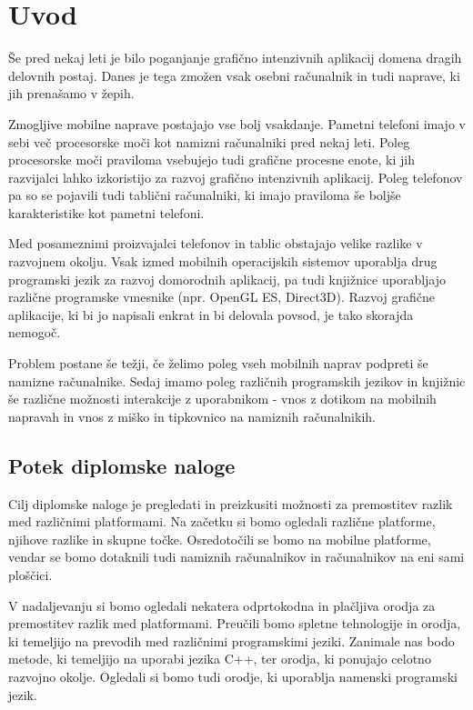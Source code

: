 \chapter{Uvod}

Še pred nekaj leti je bilo poganjanje grafično intenzivnih aplikacij domena dragih delovnih postaj. Danes je tega zmožen vsak osebni računalnik in tudi naprave, ki jih prenašamo v žepih.

Zmogljive mobilne naprave postajajo vse bolj vsakdanje. Pametni telefoni imajo v sebi več procesorske moči kot namizni računalniki pred nekaj leti. Poleg procesorske moči praviloma vsebujejo tudi grafične procesne enote, ki jih razvijalci lahko izkoristijo za razvoj grafično intenzivnih aplikacij. Poleg telefonov pa so se pojavili tudi tablični računalniki, ki imajo praviloma še boljše karakteristike kot pametni telefoni. 

Med posameznimi proizvajalci telefonov in tablic obstajajo velike razlike v razvojnem okolju. Vsak izmed mobilnih operacijskih sistemov uporablja drug programski jezik za razvoj domorodnih aplikacij, pa tudi knjižnice uporabljajo različne programske vmesnike (npr. OpenGL ES, Direct3D). Razvoj grafične aplikacije, ki bi jo napisali enkrat in bi delovala povsod, je tako skorajda nemogoč.

Problem postane še težji, če želimo poleg vseh mobilnih naprav podpreti še namizne računalnike. Sedaj imamo poleg različnih programskih jezikov in knjižnic še različne možnosti interakcije z uporabnikom - vnos z dotikom na mobilnih napravah in vnos z miško in tipkovnico na namiznih računalnikih.

\section{Potek diplomske naloge}

Cilj diplomske naloge je pregledati in preizkusiti možnosti za premostitev razlik med različnimi platformami. Na začetku si bomo ogledali različne platforme, njihove razlike in skupne točke. Osredotočili se bomo na mobilne platforme, vendar se bomo dotaknili tudi namiznih računalnikov in računalnikov na eni sami ploščici.

V nadaljevanju si bomo ogledali nekatera odprtokodna in plačljiva orodja za premostitev razlik med platformami. Preučili bomo spletne tehnologije in orodja, ki temeljijo na prevodih med različnimi programskimi jeziki. Zanimale nas bodo metode, ki temeljijo na uporabi jezika C++, ter orodja, ki ponujajo celotno razvojno okolje. Ogledali si bomo tudi orodje, ki uporablja namenski programski jezik.

